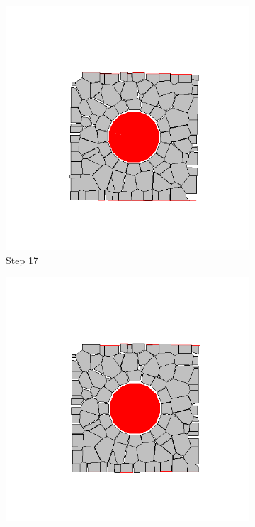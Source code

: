 \begin{figure}[ht!]
      \begin{subfigure}{.25\textwidth}
        \centering
        \includegraphics[width=1.0\linewidth]{Files/Small_ASR/CR/DEP5-STEP(017).png}
      \caption{Step 17}
      \end{subfigure}%
      \begin{subfigure}{.25\textwidth}
        \centering
        \includegraphics[width=1.0\linewidth]{Files/Small_ASR/CR/DEP5-STEP(018).png}

\end{subfigure}
\end{figure}
